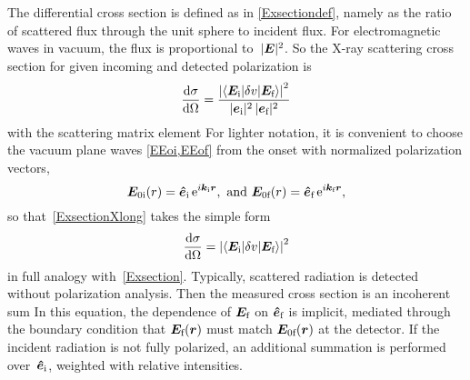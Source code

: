 The differential cross section
is defined as in \cref{Exsectiondef},
namely as the ratio of scattered flux through the unit sphere to incident flux.
%
%
%
For electromagnetic waves in vacuum, the flux is proportional to~$|\bm{E}|^2$.
So the X-ray scattering cross section for given incoming and detected polarization is
\begin{equation}%
  \xElas
  =  \frac{ {\left|\braket{\Ei|\delta v|\Ef}\right|}^2 }{|\v{e}_\si|^2\,|\v{e}_\sf|^2}
\end{equation}
with the scattering matrix element
%
For lighter notation,
it is convenient to choose the vacuum plane waves \cref{EEoi,EEof} from the onset
with normalized polarization vectors,
\begin{equation}%
  \v{E}_{0\si}(r) = \hei\, \e^{i\k_\si\r}, \text{~and~}
  \v{E}_{0\sf}(r) = \hef\, \e^{i\k_\sf\r},
\end{equation}
so that~\cref{ExsectionXlong}
takes the simple form
\begin{equation}%
  \xElas
  =  {\left|\braket{\Ei|\delta v|\Ef}\right|}^2
\end{equation}
in full analogy with~\cref{Exsection}.
Typically, scattered radiation is detected without polarization analysis.
%
%
%
%
Then the measured cross section is an incoherent sum
%
%
%
%
%
In this equation,
the dependence of $\bm{E}_{\text{f}}$ on $\bm{\hat e}_{\text{f}}$ is implicit,
mediated through the boundary condition
that $\bm{E}_{\text{f}}(\bm{r})$ must match $\bm{E}_{0\text{f}}(\bm{r})$ at the detector.
If the incident radiation is not fully polarized,
%
an additional summation is performed over~$\bm{\hat e}_{\text{i}}$,
weighted with relative intensities.

%

%
